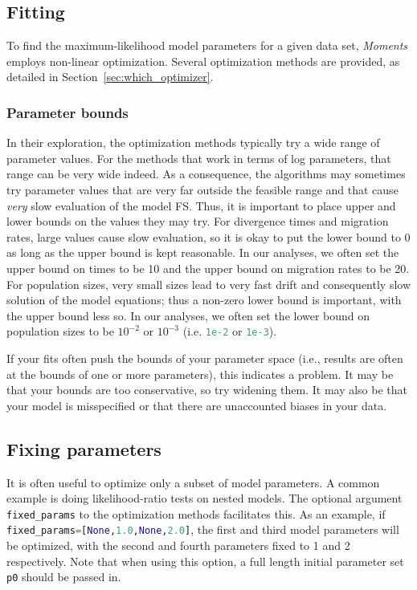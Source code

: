 \documentclass[12pt]{article}
\makeatletter
\newcommand{\py}[1]{\lstinline[breaklines=true,language=Python, showstringspaces=False]@#1@}
\makeatother
\begin{document}
\subsection{Fitting}

To find the maximum-likelihood model parameters for a given data set, \textit{Moments} employs non-linear optimization.
Several optimization methods are provided, as detailed in Section~\ref{sec:which_optimizer}.

\subsubsection{Parameter bounds}

In their exploration, the optimization methods typically try a wide range of parameter values.
For the methods that work in terms of log parameters, that range can be very wide indeed.
As a consequence, the algorithms may sometimes try parameter values that are very far outside the feasible range and that cause \emph{very} slow evaluation of the model FS.
Thus, it is important to place upper and lower bounds on the values they may try.
For divergence times and migration rates, large values cause slow evaluation, so it is okay to put the lower bound to 0 as long as the upper bound is kept reasonable.
In our analyses, we often set the upper bound on times to be 10 and the upper bound on migration rates to be 20.
For population sizes, very small sizes lead to very fast drift and consequently slow solution of the model equations; thus a non-zero lower bound is important, with the upper bound less so.
In our analyses, we often set the lower bound on population sizes to be $10^{-2}$ or $10^{-3}$ (i.e. \py{1e-2} or \py{1e-3}).

If your fits often push the bounds of your parameter space (i.e., results are often at the bounds of one or more parameters), this indicates a problem.
It may be that your bounds are too conservative, so try widening them.
It may also be that your model is misspecified or that there are unaccounted biases in your data.

\subsection{Fixing parameters}

It is often useful to optimize only a subset of model parameters.
A common example is doing likelihood-ratio tests on nested models.
The optional argument \py{fixed_params} to the optimization methods facilitates this.
As an example, if \py{fixed_params=[None,1.0,None,2.0]}, the first and third model parameters will be optimized, with the second and fourth parameters fixed to 1 and 2 respectively.
Note that when using this option, a full length initial parameter set \py{p0} should be passed in.
\end{document}
